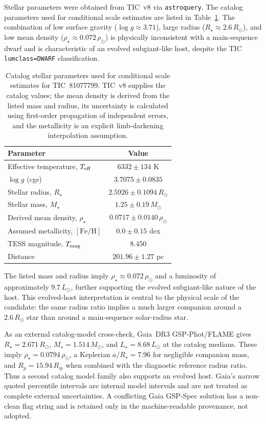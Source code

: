 \documentclass[11pt]{article}
\begin{document}
Stellar parameters were obtained from TIC~v8 \citep{Stassun2019} via
\texttt{astroquery}.  The catalog parameters used for conditional scale
estimates are listed in
Table~\ref{tab:stellar}.  The combination of low surface gravity
($\log g \approx 3.71$), large radius ($R_\star \approx 2.6\,R_\odot$),
and low mean density ($\rho_\star \approx 0.072\,\rho_\odot$) is
physically inconsistent with a main-sequence dwarf and is characteristic
of an evolved subgiant-like host, despite the TIC \texttt{lumclass=DWARF}
classification.

\begin{table}[ht]
\centering
\caption{Catalog stellar parameters used for conditional scale estimates for
  TIC~81077799.  TIC~v8 supplies the
  catalog values; the mean density is derived from the listed mass and radius,
  its uncertainty is calculated using first-order propagation of independent
  errors, and the
  metallicity is an explicit limb-darkening interpolation assumption.}
\label{tab:stellar}
\begin{tabular}{lc}
\toprule
Parameter & Value \\
\midrule
Effective temperature, $T_{\rm eff}$ & $6332 \pm 134$ K \\
$\log g$ (cgs)   & $3.7075 \pm 0.0835$ \\
Stellar radius, $R_\star$          & $2.5926 \pm 0.1094\,R_\odot$ \\
Stellar mass, $M_\star$            & $1.25 \pm 0.19\,M_\odot$ \\
Derived mean density, $\rho_\star$ & $0.0717 \pm 0.0140\,\rho_\odot$ \\
Assumed metallicity, $[\mathrm{Fe}/\mathrm{H}]$ & $0.0 \pm 0.15$ dex \\
TESS magnitude, $T_{\rm mag}$ & 8.450 \\
Distance         & $201.96 \pm 1.27$ pc \\
\bottomrule
\end{tabular}
\end{table}

The listed mass and radius imply $\rho_\star \approx 0.072\,\rho_\odot$ and a
luminosity of approximately $9.7\,L_\odot$, further supporting the evolved subgiant-like
nature of the host. This evolved-host interpretation is central to the physical scale of the
candidate: the same radius ratio implies a much larger companion around a $2.6\,R_\odot$
star than around a main-sequence solar-radius star.

As an external catalog-model cross-check, Gaia~DR3 GSP-Phot/FLAME gives
$R_\star=2.671\,R_\odot$, $M_\star=1.514\,M_\odot$, and
$L_\star=8.68\,L_\odot$ at the catalog medians.  These imply
$\rho_\star=0.0794\,\rho_\odot$, a Keplerian
$a/R_\star=7.96$ for negligible companion mass, and $R_p=15.94\,R_\oplus$
when combined with the diagnostic reference
radius ratio.  Thus a second catalog model family also supports an evolved
host.  Gaia's narrow
quoted percentile intervals are internal model intervals and are not treated
as complete external uncertainties.  A conflicting Gaia GSP-Spec solution
has a non-clean flag string and is retained only in the machine-readable
provenance, not adopted.
\end{document}
